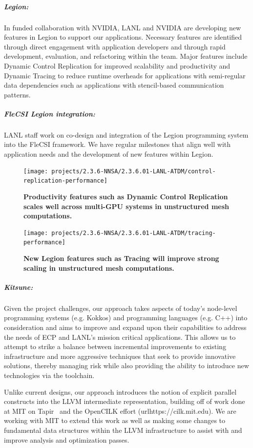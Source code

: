 \subparagraph{Legion:}

In funded collaboration with NVIDIA, LANL and NVIDIA are developing new features in Legion to support our applications. Necessary features are identified through direct engagement with application developers and through rapid development, evaluation, and refactoring within the team. Major features include Dynamic Control Replication for improved scalability and productivity and Dynamic Tracing to reduce runtime overheads for  applications with semi-regular data dependencies such as applications with stencil-based communication patterns. 


\subparagraph{FleCSI Legion integration:}
LANL staff work on co-design and integration of the Legion programming system into the FleCSI framework. We have regular milestones that align well with application needs and the development of new features within Legion. 


\begin{figure}[htb]
  \centering
  \texttt{[image: projects/2.3.6-NNSA/2.3.6.01-LANL-ATDM/control-replication-performance]}
        \caption{\label{fig:control-replication-performance}\textbf{Productivity features such as Dynamic Control Replication scales well across multi-GPU systems in unstructured mesh computations.}}
\end{figure}

\begin{figure}[htb]
        \centering
        \texttt{[image: projects/2.3.6-NNSA/2.3.6.01-LANL-ATDM/tracing-performance]}
        \caption{\label{fig:tracing-performance}\textbf{New Legion features such as Tracing will improve strong scaling in unstructured mesh computations.}}
\end{figure}


\subparagraph{Kitsune:}
Given the project challenges, our approach takes aspects of
today's node-level programming systems (e.g. Kokkos) and
programming languages (e.g. C++) into consideration and aims to improve
and expand upon their capabilities to address the needs of ECP and LANL's
mission critical applications.  This allows us to attempt to strike a
balance between incremental improvements to existing infrastructure
and more aggressive techniques that seek to provide innovative
solutions, thereby managing risk while also providing the ability to
introduce new technologies via the toolchain. 

Unlike current designs, our approach introduces the notion of explicit
parallel constructs into the LLVM intermediate representation, building
off of work done at MIT on Tapir~\cite{2.3.6.01:kitsune:Schardl:2017}
and the OpenCILK effort (url{https://cilk.mit.edu}). We are working with
MIT to extend this work as well as making some changes to fundamental data
structures within the LLVM infrastructure to assist with and improve analysis
and optimization passes. 

